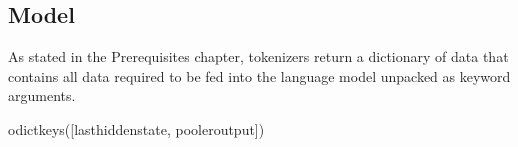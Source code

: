 \documentclass[letterpaper,10pt,english]{jupyterBook}
\begin{document}
\subsection{Model}
\label{\detokenize{Poutyne:id4}}
\sphinxAtStartPar
As stated in the Prerequisites chapter, tokenizers return a dictionary of data that contains all data required to be fed into the language model unpacked as keyword arguments.
\begin{sphinxVerbatimInput}

\begin{sphinxVerbatim}[commandchars=\\\{\}]
    

  
  

   
\end{sphinxVerbatim}
\end{sphinxVerbatimInput}
\begin{sphinxVerbatimOutput}

\begin{sphinxVerbatim}[commandchars=\\\{\}]
odict\PYGZus{}keys([\PYGZsq{}last\PYGZus{}hidden\PYGZus{}state\PYGZsq{}, \PYGZsq{}pooler\PYGZus{}output\PYGZsq{}])
\end{sphinxVerbatim}
\end{sphinxVerbatimOutput}
\end{document}
